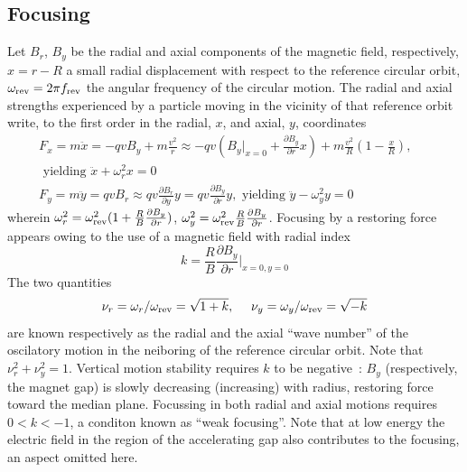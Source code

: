 \subsection{Focusing  \label{secCycloFocus}}

Let $B_r$, $B_y$  be the radial and axial components of the magnetic field, respectively, 
$x=r-R$ a small radial displacement with respect to the reference circular orbit,  
$\omega_{\rm rev} = 2\pi f_{\rm rev} $ the angular frequency of the circular motion. 
The radial and axial  strengths experienced by a particle moving in the vicinity of that reference orbit 
write, to the first order in the radial, $x$,  and axial, $y$, coordinates 
\begin{eqnarray}
\label{EqCycloFoc}
F_x = m \ddot x=  -qvB_y + m\frac{v^2}{r} \approx -q v (B_y|_{x=0} + \frac{\partial B_y}{\partial r}x)  + m\frac{v^2}{R}(1-\frac{x}{R}), & \nonumber \\ 
\textrm{~yielding~}  \ddot x + \omega_r^2 x=0 &  \nonumber \\
F_y= m\ddot y =   qvB_r \approx q v \frac{\partial B_r}{\partial y} y = q v \frac{\partial B_y}{\partial r} y, 
 \textrm{~yielding~}    \ddot{y} - \omega_y^2 y= 0  & ~ ~ ~ 
\end{eqnarray}
wherein 
$\omega_r^2 = \omega_{\rm rev}^2(1+\frac{R}{B}\frac{\partial B_y}{\partial r})$,  
$ \omega_y^2 = \omega_{\rm rev}^2 \frac{R}{B} \frac{\partial B_y}{\partial r}$. 
Focusing by a restoring force appears owing to the use of a magnetic field with radial 
index 
\begin{equation}
\label{EqCycloRadialIndex}
k = \frac{R}{B}\frac{\partial B_y}{\partial r}|_{x=0,y=0}
\end{equation}
The two quantities 
\begin{equation}
  \nu_r = \omega_r/\omega_{\rm rev} = \sqrt{1+k},   ~ ~ ~ ~ 
 \nu_y=\omega_y /\omega_{\rm rev}  = \sqrt{-k} 
\end{equation}
are known  respectively as the radial and the axial ``wave number'' of 
the oscilatory motion in the neiboring of the reference circular orbit.
Note that $\nu_r^2 + \nu_y^2=1$.
Vertical motion stability requires $k$ to be negative~:  $B_y$ (respectively, the magnet gap) 
is slowly  decreasing (increasing) with radius, restoring force toward the 
median plane. 
Focussing in both radial and axial motions requires $0 < k <-1$, a conditon known as ``weak focusing''.
 Note that  at low energy  the electric field in the 
region of the accelerating gap also contributes to the focusing, an aspect omitted here. 


